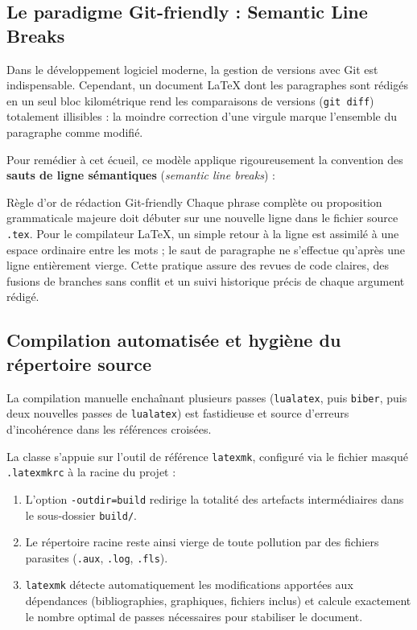 \subsection{Le paradigme Git-friendly : Semantic Line Breaks}
\label{subsec:semantic_breaks}

Dans le développement logiciel moderne, la gestion de versions avec Git est indispensable.
Cependant, un document \LaTeX{} dont les paragraphes sont rédigés en un seul bloc kilométrique rend les comparaisons de versions (\texttt{git diff}) totalement illisibles : la moindre correction d'une virgule marque l'ensemble du paragraphe comme modifié.

Pour remédier à cet écueil, ce modèle applique rigoureusement la convention des \textbf{sauts de ligne sémantiques} (\emph{semantic line breaks}) :
\begin{boiteSynthese}{Règle d'or de rédaction Git-friendly}
  Chaque phrase complète ou proposition grammaticale majeure doit débuter sur une nouvelle ligne dans le fichier source \texttt{.tex}.
  Pour le compilateur \LaTeX{}, un simple retour à la ligne est assimilé à une espace ordinaire entre les mots ; le saut de paragraphe ne s'effectue qu'après une ligne entièrement vierge.
  Cette pratique assure des revues de code claires, des fusions de branches sans conflit et un suivi historique précis de chaque argument rédigé.
\end{boiteSynthese}

\subsection{Compilation automatisée et hygiène du répertoire source}
\label{subsec:compilation_build}

La compilation manuelle enchaînant plusieurs passes (\texttt{lualatex}, puis \texttt{biber}, puis deux nouvelles passes de \texttt{lualatex}) est fastidieuse et source d'erreurs d'incohérence dans les références croisées.

La classe s'appuie sur l'outil de référence \texttt{latexmk}, configuré via le fichier masqué \texttt{.latexmkrc} à la racine du projet :
\begin{enumerate}
  \item L'option \texttt{-outdir=build} redirige la totalité des artefacts intermédiaires dans le sous-dossier \texttt{build/}.
  \item Le répertoire racine reste ainsi vierge de toute pollution par des fichiers parasites (\texttt{.aux}, \texttt{.log}, \texttt{.fls}).
  \item \texttt{latexmk} détecte automatiquement les modifications apportées aux dépendances (bibliographies, graphiques, fichiers inclus) et calcule exactement le nombre optimal de passes nécessaires pour stabiliser le document.
\end{enumerate}

